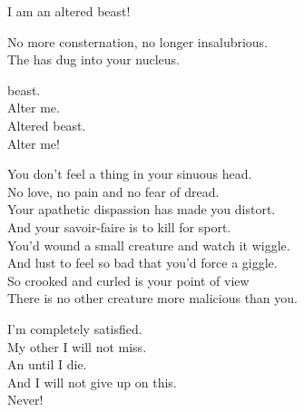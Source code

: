 I am an altered beast! \\





No more consternation, no longer insalubrious. \\
The   has dug into your nucleus. \\


 beast. \\
Alter me. \\
Altered beast. \\
Alter me! \\





You don't feel a thing in your sinuous head. \\
No love, no pain and no fear of dread. \\

Your apathetic dispassion has made you distort. \\
And your savoir-faire is to kill for sport. \\

You'd wound a small creature and watch it wiggle. \\
And lust to feel so bad that you'd force a giggle. \\

So crooked and curled is your point of view \\
There is no other creature more malicious than you. \\


I'm completely satisfied. \\
My other  I will not miss. \\
An   until I die. \\
And I will not give up on this. \\
Never! \\

